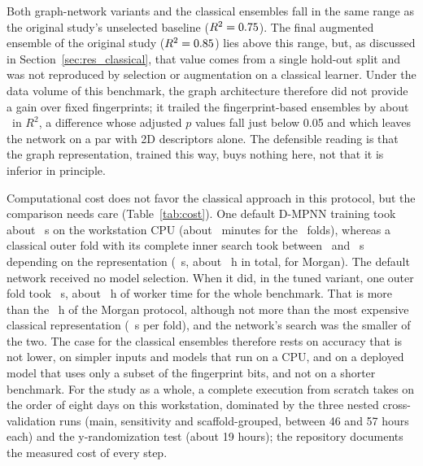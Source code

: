 Both graph-network variants and the classical ensembles fall in the same range as the original study's unselected baseline ($R^2 = 0.75$). The final augmented ensemble of the original study ($R^2 = 0.85$) lies above this range, but, as discussed in Section~\ref{sec:res_classical}, that value comes from a single hold-out split and was not reproduced by selection or augmentation on a classical learner. Under the data volume of this benchmark, the graph architecture therefore did not provide a gain over fixed fingerprints; it trailed the fingerprint-based ensembles by about \GnnTunedVsMorganDiffRTwo\ in $R^2$, a difference whose adjusted $p$ values fall just below 0.05 and which leaves the network on a par with 2D descriptors alone. The defensible reading is that the graph representation, trained this way, buys nothing here, not that it is inferior in principle.

\label{sec:cost_results}
Computational cost does not favor the classical approach in this protocol, but the comparison needs care (Table~\ref{tab:cost}). One default D-MPNN training took about \GnnFoldSecMean\ s on the workstation CPU (about \GnnTotalMin\ minutes for the \TotalOuterFolds\ folds), whereas a classical outer fold with its complete inner search took between \ClassicalFoldSecMin\ and \ClassicalFoldSecMax\ s depending on the representation (\ClassicalMorganFoldSec\ s, about \ClassicalMorganTotalHours\ h in total, for Morgan). The default network received no model selection. When it did, in the tuned variant, one outer fold took \GnnTunedFoldSecMean\ s, about \GnnTunedTotalHours\ h of worker time for the whole benchmark. That is more than the \ClassicalMorganTotalHours\ h of the Morgan protocol, although not more than the most expensive classical representation (\ClassicalFoldSecMax\ s per fold), and the network's search was the smaller of the two. The case for the classical ensembles therefore rests on accuracy that is not lower, on simpler inputs and models that run on a CPU, and on a deployed model that uses only a subset of the fingerprint bits, and not on a shorter benchmark. For the study as a whole, a complete execution from scratch takes on the order of eight days on this workstation, dominated by the three nested cross-validation runs (main, sensitivity and scaffold-grouped, between 46 and 57 hours each) and the y-randomization test (about 19 hours); the repository documents the measured cost of every step.

